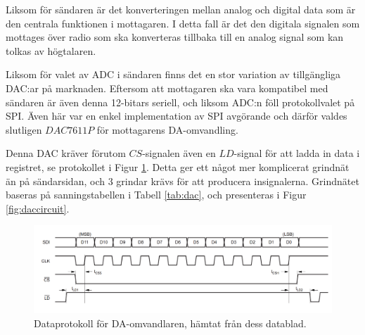\documentclass[a4paper,10pt]{article}
\begin{document}
Liksom för sändaren är det konverteringen mellan analog och digital data som
är den centrala funktionen i mottagaren. I detta fall är det den digitala 
signalen som mottages över radio som ska konverteras tillbaka till en analog
signal som kan tolkas av högtalaren.

Liksom för valet av ADC i sändaren finns det en stor variation av tillgängliga 
DAC:ar på marknaden. Eftersom att mottagaren ska vara kompatibel med sändaren
är även denna 12-bitars seriell, och liksom ADC:n föll protokollvalet på SPI. 
Även här var en enkel implementation av SPI avgörande och därför valdes 
slutligen $DAC7611P$ för mottagarens DA-omvandling. 

Denna DAC kräver förutom $CS$-signalen även en $LD$-signal för att ladda in data
i registret, se protokollet i Figur \ref{fig:dacprotocol}. Detta ger ett något 
mer komplicerat grindnät än på sändarsidan, och 3 grindar krävs för att 
producera insignalerna. Grindnätet baseras på sanningstabellen i Tabell 
\ref{tab:dac}, och presenteras i Figur 
\ref{fig:daccircuit}.

\begin{figure}[h]
\centering
\includegraphics[width=\textwidth]{dacdiagram.png}
\caption{Dataprotokoll för DA-omvandlaren, hämtat från dess datablad.}
\label{fig:dacprotocol}
\end{figure}
\end{document}
